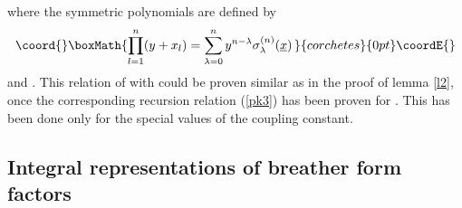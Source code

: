 \documentclass[a4paper,a4paper]{article}
\begin{document}
where the symmetric polynomials \coordHE{} are defined by 
\[\coord{}\boxMath{
\prod_{l=1}^{n}(y+x_{l})=\sum_{\lambda =0}^{n}y^{n-\lambda }\sigma _{\lambda
}^{(n)}(\underline{x})\, 
}{corchetes}{0pt}\coordE{}\]
and \coordHE{}. This
relation of \coordHE{} with \coordHE{} could be proven similar as in the proof of lemma \ref{l2},
once the corresponding recursion relation (\ref{pk3}) has been proven for \coordHE{}. This has been done \cite{FMS} only for the
special values \coordHE{} of the coupling constant.

\subsection{Integral representations of breather form factors\label{s6.2}}
\end{document}
